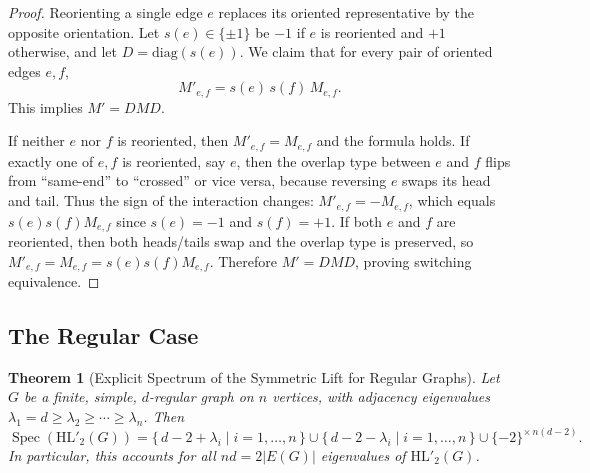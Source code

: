 \documentclass[11pt]{article}
\newtheorem{theorem}{Theorem}
\newcommand{\HL}{\mathrm{HL}}
\theoremstyle{plain}
\begin{document}
\begin{proof}
Reorienting a single edge $e$ replaces its oriented representative by the opposite orientation.
Let $s(e)\in\{\pm1\}$ be $-1$ if $e$ is reoriented and $+1$ otherwise, and let
$D=\mathrm{diag}(s(e))$.
We claim that for every pair of oriented edges $e,f$,
\[
M'_{e,f} = s(e)\,s(f)\,M_{e,f}.
\]
This implies $M'=DM D$.

If neither $e$ nor $f$ is reoriented, then $M'_{e,f}=M_{e,f}$ and the formula holds.
If exactly one of $e,f$ is reoriented, say $e$, then the overlap type between $e$ and $f$ flips
from “same-end” to “crossed” or vice versa, because reversing $e$ swaps its head and tail.
Thus the sign of the interaction changes: $M'_{e,f}=-M_{e,f}$, which equals $s(e)s(f)M_{e,f}$
since $s(e)=-1$ and $s(f)=+1$.
If both $e$ and $f$ are reoriented, then both heads/tails swap and the overlap type is preserved,
so $M'_{e,f}=M_{e,f}=s(e)s(f)M_{e,f}$.
Therefore $M'=DMD$, proving switching equivalence.
\end{proof}



\subsection{The Regular Case}

\begin{theorem}[Explicit Spectrum of the Symmetric Lift for Regular Graphs]\label{thm:regular-spectrum}
Let \( G \) be a finite, simple, \( d \)-regular graph on \(n\) vertices, with adjacency eigenvalues
\( \lambda_1 = d \ge \lambda_2 \ge \cdots \ge \lambda_n \). Then
\[
\operatorname{Spec}(\mathrm{HL}'_2(G))
=
\{\, d - 2 + \lambda_i \mid i=1,\dots,n \,\}
\cup
\{\, d - 2 - \lambda_i \mid i=1,\dots,n \,\}
\cup
\{-2\}^{\times\, n(d-2)}.
\]
In particular, this accounts for all \(nd=2|E(G)|\) eigenvalues of \(\HL'_2(G)\).
\end{theorem}
\end{document}
